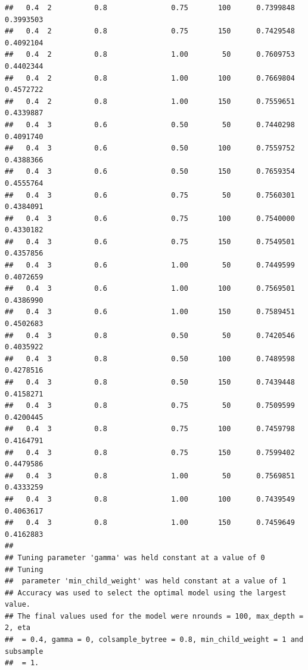 \documentclass[
]{book}
\newenvironment{Shaded}{\begin{snugshade}}{\end{snugshade}}
\newcommand{\NormalTok}[1]{#1}
\newcommand{\OperatorTok}[1]{\textcolor[rgb]{0.81,0.36,0.00}{\textbf{#1}}}
\theoremstyle{break}
\theoremstyle{definition}
\theoremstyle{definition}
\theoremstyle{definition}
\theoremstyle{remark}
\begin{document}
\begin{verbatim}
##   0.4  2          0.8               0.75       100      0.7399848  0.3993503
##   0.4  2          0.8               0.75       150      0.7429548  0.4092104
##   0.4  2          0.8               1.00        50      0.7609753  0.4402344
##   0.4  2          0.8               1.00       100      0.7669804  0.4572722
##   0.4  2          0.8               1.00       150      0.7559651  0.4339887
##   0.4  3          0.6               0.50        50      0.7440298  0.4091740
##   0.4  3          0.6               0.50       100      0.7559752  0.4388366
##   0.4  3          0.6               0.50       150      0.7659354  0.4555764
##   0.4  3          0.6               0.75        50      0.7560301  0.4384091
##   0.4  3          0.6               0.75       100      0.7540000  0.4330182
##   0.4  3          0.6               0.75       150      0.7549501  0.4357856
##   0.4  3          0.6               1.00        50      0.7449599  0.4072659
##   0.4  3          0.6               1.00       100      0.7569501  0.4386990
##   0.4  3          0.6               1.00       150      0.7589451  0.4502683
##   0.4  3          0.8               0.50        50      0.7420546  0.4035922
##   0.4  3          0.8               0.50       100      0.7489598  0.4278516
##   0.4  3          0.8               0.50       150      0.7439448  0.4158271
##   0.4  3          0.8               0.75        50      0.7509599  0.4200445
##   0.4  3          0.8               0.75       100      0.7459798  0.4164791
##   0.4  3          0.8               0.75       150      0.7599402  0.4479586
##   0.4  3          0.8               1.00        50      0.7569851  0.4333259
##   0.4  3          0.8               1.00       100      0.7439549  0.4063617
##   0.4  3          0.8               1.00       150      0.7459649  0.4162883
## 
## Tuning parameter 'gamma' was held constant at a value of 0
## Tuning
##  parameter 'min_child_weight' was held constant at a value of 1
## Accuracy was used to select the optimal model using the largest value.
## The final values used for the model were nrounds = 100, max_depth = 2, eta
##  = 0.4, gamma = 0, colsample_bytree = 0.8, min_child_weight = 1 and subsample
##  = 1.
\end{verbatim}

\begin{Shaded}
\end{Shaded}
\end{document}
